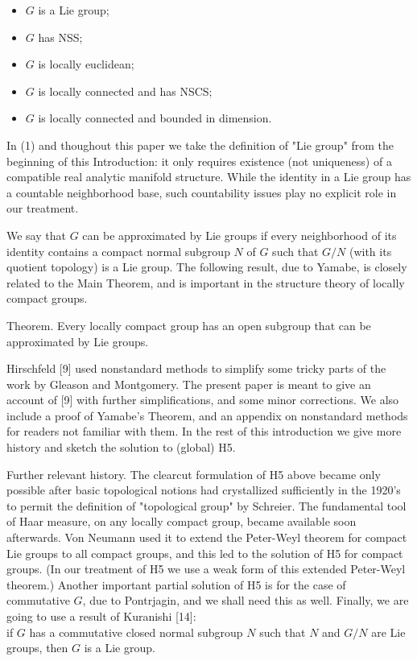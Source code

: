 \documentclass[10pt]{article}
\begin{document}
\begin{itemize}
  \item[(1)] $G$ is a Lie group;
  \item[(2)] $G$ has NSS;
  \item[(3)] $G$ is locally euclidean;
  \item[(4)] $G$ is locally connected and has NSCS;
  \item[(5)] $G$ is locally connected and bounded in dimension.
\end{itemize}

In (1) and thoughout this paper we take the definition of "Lie group" from the beginning of this Introduction: it only requires existence (not uniqueness) of a\\
compatible real analytic manifold structure. While the identity in a Lie group has a countable neighborhood base, such countability issues play no explicit role in our treatment.

We say that $G$ can be approximated by Lie groups if every neighborhood of its identity contains a compact normal subgroup $N$ of $G$ such that $G / N$ (with its quotient topology) is a Lie group. The following result, due to Yamabe, is closely related to the Main Theorem, and is important in the structure theory of locally compact groups.

Theorem. Every locally compact group has an open subgroup that can be approximated by Lie groups.

Hirschfeld [9] used nonstandard methods to simplify some tricky parts of the work by Gleason and Montgomery. The present paper is meant to give an account of [9] with further simplifications, and some minor corrections. We also include a proof of Yamabe's Theorem, and an appendix on nonstandard methods for readers not familiar with them. In the rest of this introduction we give more history and sketch the solution to (global) H5.

Further relevant history. The clearcut formulation of H5 above became only possible after basic topological notions had crystallized sufficiently in the 1920's to permit the definition of "topological group" by Schreier. The fundamental tool of Haar measure, on any locally compact group, became available soon afterwards. Von Neumann used it to extend the Peter-Weyl theorem for compact Lie groups to all compact groups, and this led to the solution of H5 for compact groups. (In our treatment of H5 we use a weak form of this extended Peter-Weyl theorem.) Another important partial solution of H5 is for the case of commutative $G$, due to Pontrjagin, and we shall need this as well. Finally, we are going to use a result of Kuranishi [14]:\\
if $G$ has a commutative closed normal subgroup $N$ such that $N$ and $G / N$ are Lie groups, then $G$ is a Lie group.
\end{document}
